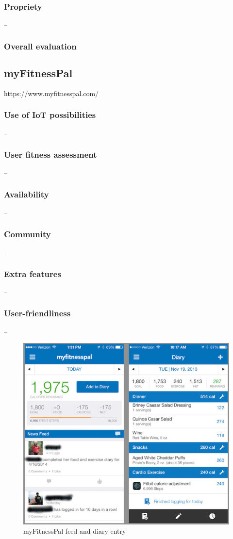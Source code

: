\subsubsection*{Propriety} -- 
\subsubsection*{Overall evaluation}
\subsection{myFitnessPal}
https://www.myfitnesspal.com/
\subsubsection*{Use of IoT possibilities} --
\subsubsection*{User fitness assessment} --
\subsubsection*{Availability} --
\subsubsection*{Community} -- 
\subsubsection*{Extra features} -- 
\subsubsection*{User-friendliness} -- 

\begin{figure}[h]
    \includegraphics[width=\textwidth]{Images/myfitnesspal-researchgate.png}
    \caption{myFitnessPal feed and diary entry\cite{MFP-diary-img}}
\end{figure}

